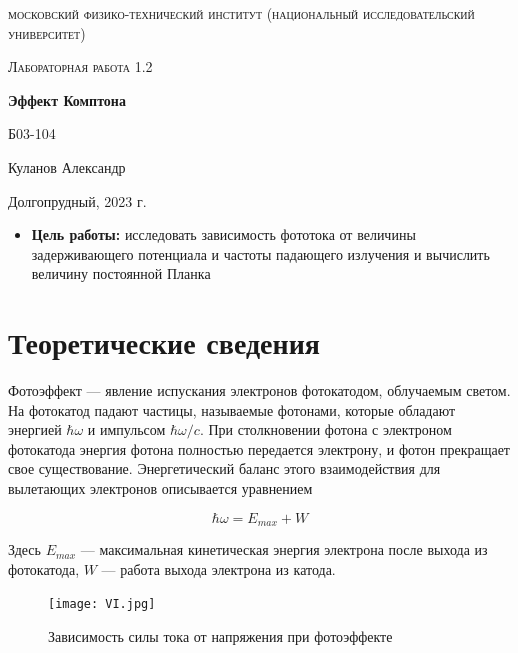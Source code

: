 \documentclass[a4paper, 12pt]{article}
\begin{document}
\begin{titlepage}
	\centering
	\vspace{5cm}
	{\scshape\LARGE московский физико-технический институт (национальный исследовательский университет) \par}
	\vspace{6cm}
	{\scshape\Large Лабораторная работа 1.2 \par}
	{\huge\bfseries Эффект Комптона \par}
	\vspace{1cm}
	\vfill
\begin{flushright}
	{\large Б03-104}\par
	\vspace{0.3cm}
	{\LARGE Куланов Александр}
\end{flushright}
	

	\vfill


	Долгопрудный, 2023 г.
\end{titlepage}

\begin{itemize}
	\item \textbf{Цель работы:} исследовать зависимость фототока от величины задерживающего потенциала и частоты падающего излучения и вычислить величину постоянной Планка
\end{itemize}

\section{Теоретические сведения}

Фотоэффект --- явление испускания электронов фотокатодом, облучаемым светом. На фотокатод падают частицы, 
называемые фотонами, которые обладают энергией $\hbar \omega$ и импульсом $\hbar\omega/c$. 
При столкновении фотона с электроном фотокатода энергия фотона полностью передается электрону, и фотон прекращает свое существование. Энергетический баланс этого взаимодействия для вылетающих электронов описывается уравнением

\begin{equation}
	\hbar \omega = E_{max} + W
	\label{eq:energy}
\end{equation}

Здесь $ E_{max} $ ---  максимальная кинетическая энергия электрона после выхода из фотокатода, $ W $ --- работа выхода электрона из катода.

\begin{figure}[H]
    \centering
    \texttt{[image: VI.jpg]}
    \caption{Зависимость силы тока от напряжения при фотоэффекте}
    \label{fig:IV}
\end{figure}
\end{document}
